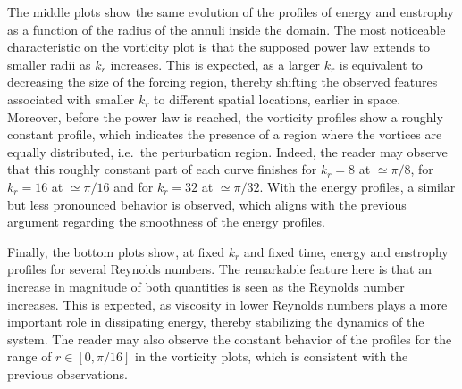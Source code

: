 \documentclass[../main.tex]{subfiles}
\begin{document}
The middle plots show the same evolution of the profiles of energy and enstrophy as a function of the radius of the annuli inside the domain. The most noticeable characteristic on the vorticity plot is that the supposed power law extends to smaller radii as $k_r$ increases. This is expected, as a larger $k_r$ is equivalent to decreasing the size of the forcing region, thereby shifting the observed features associated with smaller $k_r$ to different spatial locations, earlier in space. Moreover, before the power law is reached, the vorticity profiles show a roughly constant profile, which indicates the presence of a region where the vortices are equally distributed, i.e.\ the perturbation region. Indeed, the reader may observe that this roughly constant part of each curve finishes for $k_r=8$ at $\simeq \pi/8$, for $k_r=16$ at $\simeq \pi/16$ and for $k_r=32$ at $\simeq \pi/32$. With the energy profiles, a similar but less pronounced behavior is observed, which aligns with the previous argument regarding the smoothness of the energy profiles.

Finally, the bottom plots show, at fixed $k_r$ and fixed time, energy and enstrophy profiles for several Reynolds numbers. The remarkable feature here is that an increase in magnitude of both quantities is seen as the Reynolds number increases. This is expected, as viscosity in lower Reynolds numbers plays a more important role in dissipating energy, thereby stabilizing the dynamics of the system. The reader may also observe the constant behavior of the profiles for the range of $r\in [0,\pi/16]$ in the vorticity plots, which is consistent with the previous observations.
\end{document}
